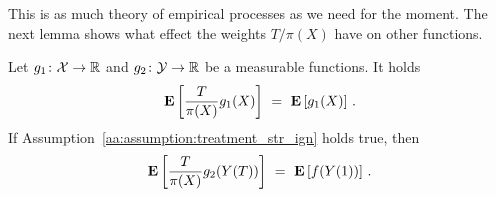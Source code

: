 This is as much theory of empirical processes as we need for the moment. 
The next lemma shows what effect the weights
$T/\pi(X)$ have on other functions.
\begin{lemma}
  \label{ps_weights_lemma}
  Let
  $
  g_1\colon
  \mathcal{X}\to\mathbb{R}
  $
  and
  $
  g_2\colon
  \mathcal{Y}\to\mathbb{R}
  $
  be a measurable functions.
  It holds
  \begin{gather*}
    \E
    \left[
    \frac{T}{\pi(X)}
    g_1(X)
    \right]
    \ 
    =
    \ 
    \E
    \left[
    g_1(X)
    \right]
    \,.
  \end{gather*}
  If Assumption~\ref{aa:assumption:treatment_str_ign} holds true, then
  \begin{gather*}
    \E
    \left[
    \frac{T}{\pi(X)}
    g_2(Y(T))
    \right]
    \ 
    =
    \ 
    \E
    \left[
    f(Y(1))
    \right]
    \,.
  \end{gather*}
\end{lemma}



